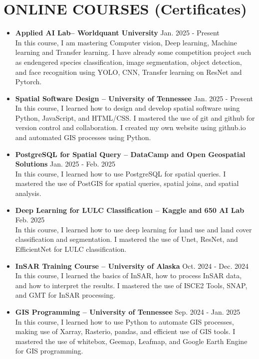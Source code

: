 \documentclass[a4paper,10pt]{article}
\begin{document}
\section*{ONLINE COURSES (Certificates)}
\begin{itemize}[leftmargin=*]
    \item \textbf{Applied AI Lab– Worldquant University} \hfill Jan. 2025 {-} Present\\
    In this course, I am mastering Computer vision, Deep learning, Machine learning and Transfer learning. I have already some competition project such as endengered species classification, 
    image segmentation, object detection, and face recognition using YOLO, CNN, Transfer learning on ResNet and Pytorch.

    \item \textbf{Spatial Software Design – University of Tennessee}  \hfill Jan. 2025 {-} Present\\
    In this course, I learned how to design and develop spatial software using Python, JavaScript, and HTML/CSS. I mastered the use of git and github for version control and collaboration. 
    I created my own website using github.io and automated GIS processes using Python.

    \item \textbf{PostgreSQL for Spatial Query – DataCamp and Open Geospatial Solutions} \hfill Jan. 2025 {-} Feb. 2025\\
    In this course, I learned how to use PostgreSQL for spatial queries. I mastered the use of PostGIS for spatial queries, spatial joins, and spatial analysis.

    \item \textbf{Deep Learning for LULC Classification – Kaggle and 650 AI Lab} \hfill Feb. 2025 \\
    In this course, I learned how to use deep learning for land use and land cover classification and segmentation. 
    I mastered the use of Unet, ResNet, and EfficientNet for LULC classification.

    \item \textbf{InSAR Training Course – University of Alaska } \hfill Oct. 2024 {-} Dec. 2024\\
    In this course, I learned the basics of InSAR, how to process InSAR data, and how to interpret the results. I mastered the use of ISCE2 Tools, SNAP, and GMT for InSAR processing.

    \item \textbf{GIS Programming – University of Tennessee} \hfill Sep. 2024 {-} Jan. 2025\\
    In this course, I learned how to use Python to automate GIS processes, making use of Xarray, Rasterio, pandas, and efficient use of GIS tools. I mastered the use of whitebox, Geemap, Leafmap, and Google Earth Engine for GIS programming.



\end{itemize}
\end{document}
